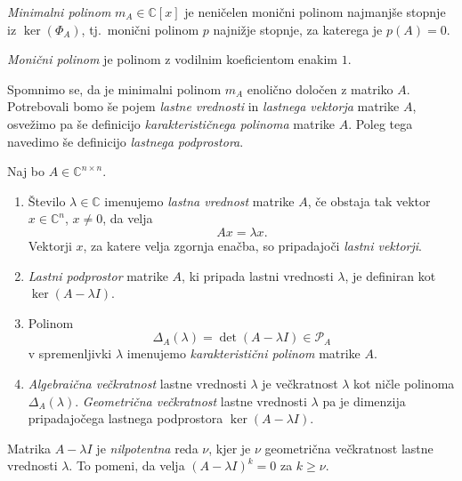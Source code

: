 \documentclass[mat1]{fmfdelo}
\newcommand{\C}{\mathbb C}
\begin{document}
\begin{definicija}
    \emph{Minimalni polinom} $m_A \in \C[x]$ je neničelen monični polinom najmanjše stopnje iz $\ker\left(\Phi_A\right)$, tj.\ monični polinom $p$ najnižje stopnje, za katerega je $p(A) = 0$.
\end{definicija}
\begin{opomba}
    \emph{Monični polinom} je polinom z vodilnim koeficientom enakim $1$.
\end{opomba}
Spomnimo se, da je minimalni polinom $m_A$ enolično določen z matriko $A$. Potrebovali bomo še pojem \emph{lastne vrednosti} in \emph{lastnega vektorja} matrike $A$, osvežimo pa še definicijo \emph{karakterističnega polinoma} matrike $A$. Poleg tega navedimo še definicijo \emph{lastnega podprostora}.
\begin{definicija}
    Naj bo $A \in \C^{n\times n}$.
    \begin{enumerate}
        \item Število $\lambda \in \C$ imenujemo \emph{lastna vrednost} matrike $A$, če obstaja tak vektor $x \in \C^n$, $x \neq 0$, da velja
        \begin{equation*}
            Ax = \lambda x.
        \end{equation*}
        Vektorji $x$, za katere velja zgornja enačba, so pripadajoči \emph{lastni vektorji}.
        \item \emph{Lastni podprostor} matrike $A$, ki pripada lastni vrednosti $\lambda$, je definiran kot $\ker \left(A - \lambda I\right)$.
        \item Polinom
        \begin{equation*}
            \Delta_A(\lambda) = \det \left(A - \lambda I\right) \in \mathcal{P}_A
        \end{equation*}
        v spremenljivki $\lambda$ imenujemo \emph{karakteristični polinom} matrike $A$.
        \item \emph{Algebraična večkratnost} lastne vrednosti $\lambda$ je večkratnost $\lambda$ kot ničle polinoma $\Delta_A\left(\lambda\right)$. \emph{Geometrična večkratnost} lastne vrednosti $\lambda$ pa je dimenzija pripadajočega lastnega podprostora $\ker \left(A - \lambda I\right)$.
    \end{enumerate}
\end{definicija}
Matrika $A - \lambda I$ je \emph{nilpotentna} reda $\nu$, kjer je $\nu$ geometrična večkratnost lastne vrednosti $\lambda$. To pomeni, da velja $\left(A - \lambda I\right)^k = 0$ za $k \geq \nu$.
\end{document}
